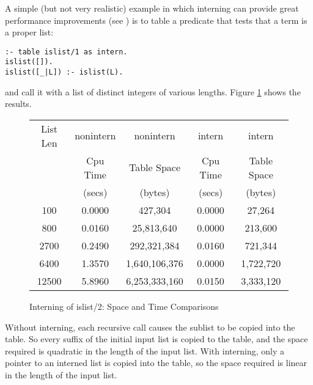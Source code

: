 \documentclass{llncs}
\begin{document}
A simple (but not very realistic) example in which interning can
provide great performance improvements (see \cite{zhou-hash-consing})
is to table a predicate that tests that a term is a proper list:
\begin{verbatim}
:- table islist/1 as intern.
islist([]).
islist([_|L]) :- islist(L).
\end{verbatim}
and call it with a list of distinct integers of various lengths.
Figure \ref{islist-table} shows the results.
\begin{figure}
\begin{center}
\begin{tabular}{|c|c|c|c|c|}
\hline
List Len &  nonintern &      nonintern  &     intern &      intern \\
         &   Cpu Time &     Table Space &    Cpu Time &    Table Space \\
	 &    (secs)  &        (bytes)  &      (secs) &      (bytes)\\ \hline
  100  &      0.0000  &           427,304  &   0.0000 &          27,264 \\
  800  &      0.0160  &        25,813,640  &   0.0000 &         213,600 \\
 2700  &      0.2490  &       292,321,384  &   0.0160 &         721,344 \\
 6400  &      1.3570  &     1,640,106,376  &   0.0000 &       1,722,720 \\
12500  &      5.8960  &     6,253,333,160  &   0.0150 &       3,333,120 \\ \hline
\end{tabular}
\caption{Interning of islist/2: Space and Time Comparisons}\label{islist-table}
\end{center}
\end{figure}
Without interning, each recursive call causes the sublist to be copied
into the table.  So every suffix of the initial input list is copied
to the table, and the space required is quadratic in the length of the
input list.  With interning, only a pointer to an interned list is
copied into the table, so the space required is linear in the length
of the input list.
\end{document}
